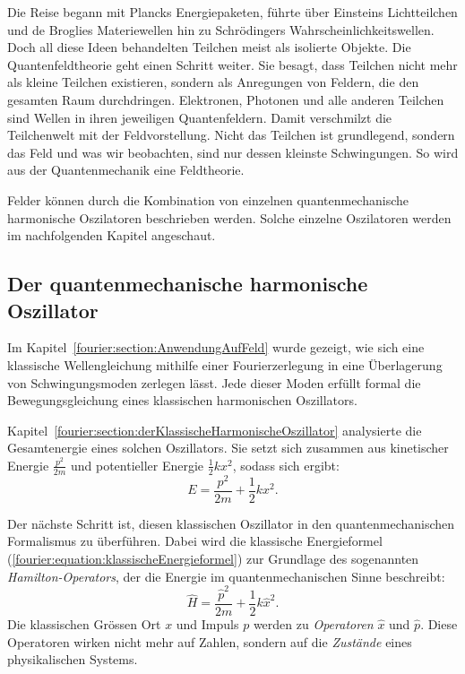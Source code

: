 	Die Reise begann mit Plancks Energiepaketen, führte über Einsteins Lichtteilchen und de Broglies Materiewellen hin zu Schrödingers Wahrscheinlichkeitswellen. 
	Doch all diese Ideen behandelten Teilchen meist als isolierte Objekte.
	Die Quantenfeldtheorie geht einen Schritt weiter.
	Sie besagt, dass Teilchen nicht mehr als kleine Teilchen existieren, sondern als Anregungen von Feldern, die den gesamten Raum durchdringen. 
	Elektronen, Photonen und alle anderen Teilchen sind Wellen in ihren jeweiligen Quantenfeldern.
	Damit verschmilzt die Teilchenwelt mit der Feldvorstellung.
	Nicht das Teilchen ist grundlegend, sondern das Feld und was wir beobachten, sind nur dessen kleinste Schwingungen.
	So wird aus der Quantenmechanik eine Feldtheorie.
	
	
	Felder können durch die Kombination von einzelnen quantenmechanische harmonische Oszilatoren beschrieben werden. Solche einzelne Oszilatoren werden im nachfolgenden Kapitel angeschaut.
	
	
	\subsection{Der quantenmechanische harmonische Oszillator\label{fourier:subsection:derQMHarmonischeOszillator}}

	Im Kapitel~\ref{fourier:section:AnwendungAufFeld} wurde gezeigt, wie sich eine klassische Wellengleichung mithilfe einer Fourierzerlegung in eine Überlagerung von Schwingungsmoden zerlegen lässt.
	Jede dieser Moden erfüllt formal die Bewegungsgleichung eines klassischen harmonischen Oszillators.

	Kapitel~\ref{fourier:section:derKlassischeHarmonischeOszillator} analysierte die Gesamtenergie eines solchen Oszillators.
	Sie setzt sich zusammen aus kinetischer Energie $\frac{p^2}{2m}$ und potentieller Energie $\frac{1}{2}kx^2$, sodass sich ergibt:
	\begin{equation}\label{fourier:equation:klassischeEnergieformel}
	E = \frac{p^2}{2m} + \frac{1}{2}kx^2.
	\end{equation}

	Der nächste Schritt ist, diesen klassischen Oszillator in den quantenmechanischen Formalismus zu überführen.
	Dabei wird die klassische Energieformel (\ref{fourier:equation:klassischeEnergieformel}) zur Grundlage des sogenannten \emph{Hamilton-Operators}, der die Energie im quantenmechanischen Sinne beschreibt:
	\begin{equation}
	\hat{H} = \frac{\hat{p}^2}{2m} + \frac{1}{2} k \hat{x}^2.
	\label{fourier:equation:hamiltonOperator}
	\end{equation}
	Die klassischen Grössen Ort $x$ und Impuls $p$ werden zu \emph{Operatoren} $\hat{x}$ und $\hat{p}$.
	Diese Operatoren wirken nicht mehr auf Zahlen, sondern auf die \emph{Zustände} eines physikalischen Systems.
	
